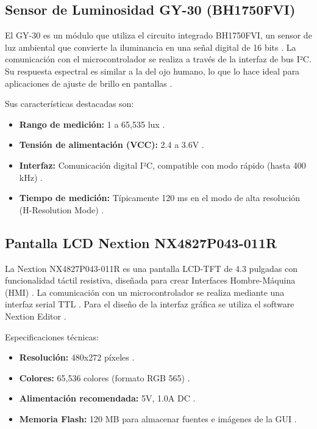 \subsection{Sensor de Luminosidad GY-30 (BH1750FVI)}

El GY-30 es un módulo que utiliza el circuito integrado BH1750FVI, un sensor de luz ambiental que convierte la iluminancia en una señal digital de 16 bits \cite{gy30}. La comunicación con el microcontrolador se realiza a través de la interfaz de bus I²C. Su respuesta espectral es similar a la del ojo humano, lo que lo hace ideal para aplicaciones de ajuste de brillo en pantallas \cite{gy30}.

Sus características destacadas son:


\begin{itemize}
    \item \textbf{Rango de medición:} 1 a 65,535 lux \cite{gy30}.
    \item \textbf{Tensión de alimentación (VCC):} 2.4 a 3.6V \cite{gy30}.
    \item \textbf{Interfaz:} Comunicación digital I²C, compatible con modo rápido (hasta 400 kHz) \cite{gy30}.
    \item \textbf{Tiempo de medición:} Típicamente 120 ms en el modo de alta resolución (H-Resolution Mode) \cite{gy30}.
\end{itemize}

\subsection{Pantalla LCD Nextion NX4827P043-011R}

La Nextion NX4827P043-011R es una pantalla LCD-TFT de 4.3 pulgadas con funcionalidad táctil resistiva, diseñada para crear Interfaces Hombre-Máquina (HMI) \cite{nextion}. La comunicación con un microcontrolador se realiza mediante una interfaz serial TTL \cite{nextion}. Para el diseño de la interfaz gráfica se utiliza el software Nextion Editor \cite{nextion}.

Especificaciones técnicas:

\begin{itemize}
    \item \textbf{Resolución:} 480x272 píxeles \cite{nextion}.
    \item \textbf{Colores:} 65,536 colores (formato RGB 565) \cite{nextion}.
    \item \textbf{Alimentación recomendada:} 5V, 1.0A DC \cite{nextion}.
    \item \textbf{Memoria Flash:} 120 MB para almacenar fuentes e imágenes de la GUI \cite{nextion}.
\end{itemize}
